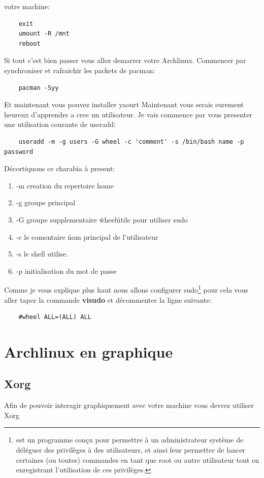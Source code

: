 \documentclass[a4paper]{book}
\begin{document}
  votre machine\@:\\
  \begin{lstlisting}
    exit
    umount -R /mnt
    reboot
  \end{lstlisting}
  Si tout c'est bien passer vous allez demarrer votre Archlinux.
  Commencer par synchroniser et rafraichir les packets de pacman\@:\\
  \begin{lstlisting}
    pacman -Syy
  \end{lstlisting}
  Et maintenant vous pouvez installer yaourt
  Maintenant vous serais surement heureux d'apprendre a cree un utilisateur.
  Je vais commence par vous presenter une utilisation courante de useradd\@:\\
  \begin{lstlisting}
    useradd -m -g users -G wheel -c 'comment' -s /bin/bash name -p password
  \end{lstlisting}
  Décortiquons ce charabia à present\@:
  \begin{enumerate}
    \item -m creation du repertoire home
    \item -g groupe principal
    \item -G groupe supplementaire \'wheel\' utile pour utiliser sudo
    \item -c le comentaire \' nom principal de l'utilisateur
    \item -s le shell utilise.
    \item -p initialisation du mot de passe
  \end{enumerate}
  Comme je vous explique plus haut nous allons configurer sudo\footnote{est un
    programme conçu pour permettre à un administrateur système de déléguer des
    privilèges à des utilisateurs, et ainsi leur permettre de lancer certaines
    (ou toutes) commandes en tant que root ou autre utilisateur tout en
  enregistrant l'utilisation de ces privilèges.}
  pour cela vous aller taper la commande \textbf{visudo}
  et décommenter la ligne suivante\@:\\
  \begin{lstlisting}
    #wheel ALL=(ALL) ALL
  \end{lstlisting}
  \part{Archlinux en graphique}
  \chapter{Xorg}
  Afin de pouvoir interagir graphiquement avec votre machine vous devrez
  utiliser Xorg
\end{document}

